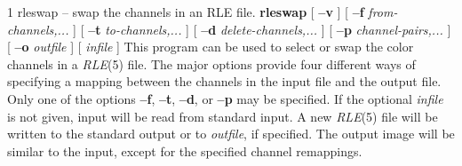 \newpage


%
%
%
 1
rleswap -- swap the channels in an RLE file.
{\bf rleswap}
[
{\bf --v}
] [
{\bf --f} 
{\it from-channels,...}
] [
{\bf --t}
{\it to-channels,...}
] [
{\bf --d} 
{\it delete-channels,...}
] [
{\bf --p} 
{\it channel-pairs,...}
] [
{\bf --o}
{\it outfile}
] [
{\it infile}
]
This program can be used to select or swap the color channels in a
{\it RLE}{\rm (5)}
file.  The major options provide four different ways of specifying a
mapping between the channels in the input file and the output file.
Only one of the options
{\bf --f}{\rm ,}
{\bf --t}{\rm ,}
{\bf --d}{\rm ,}
or
{\bf --p}
may be specified.  If the optional
{\it infile}
is not given, input will be read from standard input.  A new
{\it RLE}{\rm (5)}
file will be written to the standard output or to
{\it outfile}{\rm ,}
if specified.  The output image will be similar to the input,
except for the specified channel remappings.
